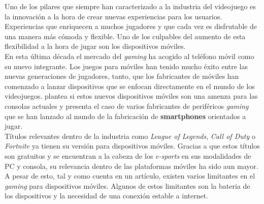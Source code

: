 Uno de los pilares que siempre han caracterizado a la industria del videojuego es la innovaci\'on a la hora de crear nuevas experiencias para los usuarios. Experiencias que enriquecen a muchos jugadores y que cada vez es disfrutable de una manera m\'as c\'omoda y flexible. Uno de los culpables del aumento de esta flexibilidad a la hora de jugar son los dispositivos m\'oviles. \\

En esta \'ultima d\'ecada el mercado del \textit{gaming} ha acogido al tel\'efono m\'ovil como su nuevo integrante. Los juegos para m\'oviles han tenido mucho \'exito entre las nuevas generaciones de jugadores, tanto, que los fabricantes de m\'oviles han comenzado a lanzar dispositivos que se enfocan directamente en el mundo de los videojuegos. \citet{moviles} plantea si estos nuevos dispositivos m\'oviles son una amenza para las consolas actuales y presenta el caso de varios fabricantes de perif\'ericos \textit{gaming} que se han lanzado al mundo de la fabricaci\'on de \textbf{smartphones} orientados a jugar. \\

T\'itulos relevantes dentro de la industria como \textit{League of Legends}, \textit{Call of Duty} o \textit{Fortnite} ya tienen su versi\'on para dispositivos m\'oviles. Gracias a que estos t\'itulos son gratuitos y se encuentran a la cabeza de los \textit{e-sports} en sus modalidades de PC y consola, su relevancia dentro de las plataformas m\'oviles ha sido aun mayor. A pesar de esto, tal y como cuenta \cite{futuro} en un art\'iculo, existen varios limitantes en el \textit{gaming} para dispositivos m\'oviles. Algunos de estos limitantes son la bateria de los dispositivos y la necesidad de una conexi\'on estable a internet.\\

